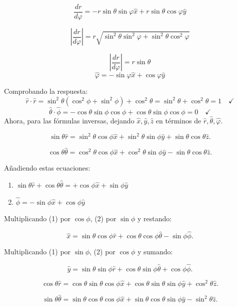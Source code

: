 \documentclass[12pt]{article}
\begin{document}
\[
\frac{dr}{d\varphi} = -r \sin\theta \sin\varphi \hat{x} + r \sin\theta \cos\varphi \hat{y}
\]

\[
\left| \frac{dr}{d\varphi} \right| = r \sqrt{\sin^2\theta \sin^2\varphi + \sin^2\theta \cos^2\varphi}
\]

\[
\left| \frac{dr}{d\varphi} \right|= r \sin\theta
\]
\[
\boxed{\hat{\varphi} = -\sin\varphi \hat{x} + \cos\varphi \hat{y}}
\]



Comprobando la respuesta:
\[
\hat{r} \cdot \hat{r} = \sin^2\theta (\cos^2\phi + \sin^2\phi) + \cos^2\theta = \sin^2\theta + \cos^2\theta = 1 \quad \checkmark
\]
\[
\hat{\theta} \cdot \hat{\phi} = -\cos\theta \sin\phi \cos\phi + \cos\theta \sin\phi \cos\phi = 0 \quad \checkmark 
\]
Ahora, para  las fórmulas inversas, dejando \( \hat{x}, \hat{y}, \hat{z} \) en términos de \( \hat{r}, \hat{\theta}, \hat{\varphi} \).


\[
\sin\theta \hat{r} = \sin^2\theta \cos\phi \hat{x} + \sin^2\theta \sin\phi \hat{y} + \sin\theta \cos\theta \hat{z}.
\]

\[
\cos\theta \hat{\theta} = \cos^2\theta \cos\phi \hat{x} + \cos^2\theta \sin\phi \hat{y} - \sin\theta \cos\theta \hat{z}.
\]

Añadiendo estas ecuaciones:

\begin{enumerate}
    \item $\sin\theta \hat{r} + \cos\theta \hat{\theta} = +\cos\phi \hat{x} + \sin\phi \hat{y}$
    \item $\hat{\phi} = -\sin\phi \hat{x} + \cos\phi \hat{y}$
\end{enumerate}

Multiplicando (1) por $\cos\phi$, (2) por $\sin\phi$ y restando:

\[
\boxed{\hat{x} = \sin\theta \cos\phi \hat{r} + \cos\theta \cos\phi \hat{\theta} - \sin\phi \hat{\phi}.}
\]

Multiplicando (1) por $\sin\phi$, (2) por $\cos\phi$ y sumando:

\[
\boxed{\hat{y} = \sin\theta \sin\phi \hat{r} + \cos\theta \sin\phi \hat{\theta} + \cos\phi \hat{\phi}.}
\]

\[
\cos\theta \hat{r} = \cos\theta \sin\theta \cos\phi \hat{x} + \cos\theta \sin\theta \sin\phi \hat{y} + \cos^2\theta \hat{z}.
\]

\[
\sin\theta \hat{\theta} = \sin\theta \cos\theta \cos\phi \hat{x} + \sin\theta \cos\theta \sin\phi \hat{y} - \sin^2\theta \hat{z}.
\]
\end{document}
